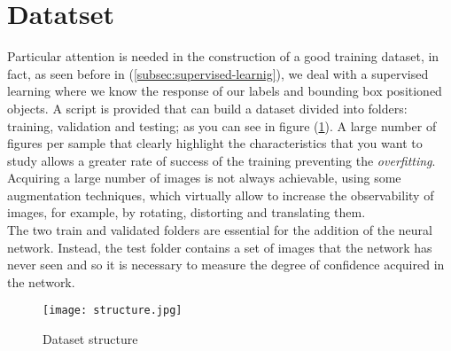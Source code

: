 \section{Datatset}
\label{sec:dataset}
Particular attention is needed in the construction of a good training dataset, 
in fact, as seen before in (\ref{subsec:supervised-learnig}), we deal with a
supervised learning where we know the response of our labels and bounding box
positioned objects. A script is provided that can build a dataset divided into
folders: training, validation and testing; as you can see in figure
(\ref{fig:datasetstructure}).
A large number of figures per sample that clearly highlight the characteristics
that you want to study allows a greater rate of success of the training
preventing the \emph{overfitting}.
Acquiring a large number of images is not always achievable, using some
augmentation techniques, which virtually allow to increase the observability of
images, for example, by rotating, distorting and translating them.\\ 
The two train and validated folders are essential for the addition of the neural
network. Instead, the test folder contains a set of images that the network has
never seen and so it is necessary to measure the degree of confidence acquired
in the network.
%
\begin{figure}[htb]
	\centering
	\texttt{[image: structure.jpg]}
	\caption{Dataset structure}
	\label{fig:datasetstructure}
\end{figure}
%
